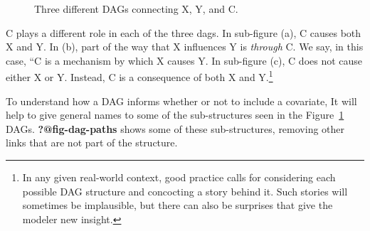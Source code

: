 \documentclass[
  letterpaper,
  DIV=11,
  numbers=noendperiod,
  oneside]{scrreprt}
\begin{document}
\begin{figure}
\begin{minipage}[t]{0.33\linewidth}
{{}

}

\end{minipage}%

\caption{\label{fig-three-dags-cancer}Three different DAGs connecting X,
Y, and C.}

\end{figure}

C plays a different role in each of the three dags. In sub-figure (a), C
causes both X and Y. In (b), part of the way that X influences Y is
\emph{through} C. We say, in this case, ``C is a mechanism by which X
causes Y. In sub-figure (c), C does not cause either X or Y. Instead, C
is a consequence of both X and Y.\footnote{In any given real-world
  context, good practice calls for considering each possible DAG
  structure and concocting a story behind it. Such stories will
  sometimes be implausible, but there can also be surprises that give
  the modeler new insight.}

To understand how a DAG informs whether or not to include a covariate,
It will help to give general names to some of the sub-structures seen in
the Figure~\ref{fig-three-dags-cancer} DAGs. \textbf{?@fig-dag-paths}
shows some of these sub-structures, removing other links that are not
part of the structure.
\end{document}
